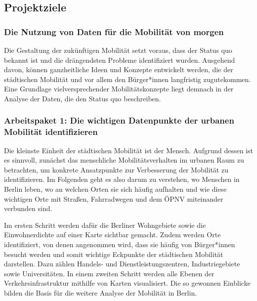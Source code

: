 \subsection{Projektziele}

\subsubsection{Die Nutzung von Daten für die Mobilität von morgen}

Die Gestaltung der zukünftigen Mobilität setzt voraus, dass der Status quo bekannt ist und die drängendsten Probleme identifiziert wurden. Ausgehend davon, können ganzheitliche Ideen und Konzepte entwickelt werden, die der städtischen Mobilität und vor allem den Bürger*innen langfristig zugutekommen. Eine Grundlage vielversprechender Mobilitätskonzepte liegt demnach in der Analyse der Daten, die den Status quo beschreiben.


\subsubsection{Arbeitspaket 1: Die wichtigen Datenpunkte der urbanen Mobilität identifizieren}

Die kleinste Einheit der städtischen Mobilität ist der Mensch. Aufgrund dessen ist es sinnvoll, zunächst das menschliche Mobilitätsverhalten im urbanen Raum zu betrachten, um konkrete Ansatzpunkte zur Verbesserung der Mobilität zu identifizieren. Im Folgenden geht es also darum zu verstehen, wo Menschen in Berlin leben, wo an welchen Orten sie sich häufig aufhalten und wie diese wichtigen Orte mit Straßen, Fahrradwegen und dem ÖPNV miteinander verbunden sind.

Im ersten Schritt werden dafür die Berliner Wohngebiete sowie die Einwohnerdichte auf einer Karte sichtbar gemacht. Zudem werden Orte identifiziert, von denen angenommen wird, dass sie häufig von Bürger*innen besucht werden und somit wichtige Eckpunkte der städtischen Mobilität darstellen. Dazu zählen Handels- und Dienstleistungszentren, Industriegebiete sowie Universitäten. In einem zweiten Schritt werden alle Ebenen der Verkehrsinfrastruktur mithilfe von Karten visualisiert. Die so gewonnen Einblicke bilden die Basis für die weitere Analyse der Mobilität in Berlin.

